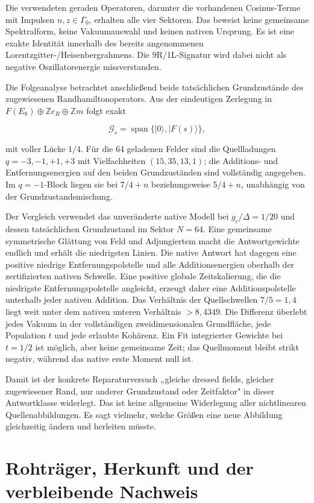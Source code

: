 Die verwendeten geraden Operatoren, darunter die vorhandenen Cosinus-Terme mit
Impulsen \(n,z\in\Gamma_0\), erhalten alle vier Sektoren. Das beweist keine
gemeinsame Spektralform, keine Vakuumauswahl und keinen nativen Ursprung.
Es ist eine exakte Identität innerhalb des bereits angenommenen
Lorentzgitter-/Heisenbergrahmens. Die 9R/1L-Signatur wird dabei nicht als
negative Oszillatorenergie missverstanden.

Die Folgeanalyse  betrachtet anschließend
beide tatsächlichen Grundzustände des zugewiesenen Randhamiltonoperators.
Aus der eindeutigen Zerlegung in \(F(E_8)\oplus\mathbb Z e_R\oplus\mathbb Zm\)
folgt exakt

\[
 \mathcal G_s=\operatorname{span}\{|0\rangle,|F(s)\rangle\},
\]

mit voller Lücke $1/4$. Für die 64 geladenen Felder sind die Quellladungen
$q=-3,-1,+1,+3$ mit Vielfachheiten $(15,35,13,1)$; die Additions- und
Entfernungsenergien auf den beiden Grundzuständen sind vollständig angegeben.
Im $q=-1$-Block liegen sie bei $7/4+n$ beziehungsweise $5/4+n$,
unabhängig von der Grundzustandsmischung.

Der Vergleich verwendet das unveränderte native Modell bei $g_c/\Delta=1/20$ und dessen tatsächlichen Grundzustand im Sektor $N=64$. Eine gemeinsame symmetrische Glättung von Feld und Adjungiertem macht die Antwortgewichte endlich und erhält die niedrigsten Linien. Die native Antwort hat dagegen eine positive niedrige Entfernungspolstelle
und alle Additionsenergien oberhalb der zertifizierten nativen Schwelle. Eine
positive globale Zeitskalierung, die die niedrigste Entfernungspolstelle
angleicht, erzeugt daher eine Additionspolstelle unterhalb jeder nativen
Addition. Das Verhältnis der Quellschwellen $7/5=1{,}4$ liegt weit unter
dem nativen unteren Verhältnis $>8{,}4349$. Die Differenz überlebt jedes
Vakuum in der vollständigen zweidimensionalen Grundfläche, jede Population
\(t\) und jede erlaubte Kohärenz. Ein Fit integrierter Gewichte bei \(t=1/2\)
ist möglich, aber keine gemeinsame Zeit; das Quellmoment bleibt strikt
negativ, während das native erste Moment null ist.

Damit ist der konkrete Reparaturversuch „gleiche dressed fields, gleicher
zugewiesener Rand, nur anderer Grundzustand oder Zeitfaktor" in dieser
Antwortklasse widerlegt. Das ist keine allgemeine Widerlegung aller
nichtlinearen Quellenabbildungen. Es sagt vielmehr, welche Größen eine neue
Abbildung gleichzeitig ändern und herleiten müsste.

\section{Rohträger, Herkunft und der verbleibende Nachweis}

